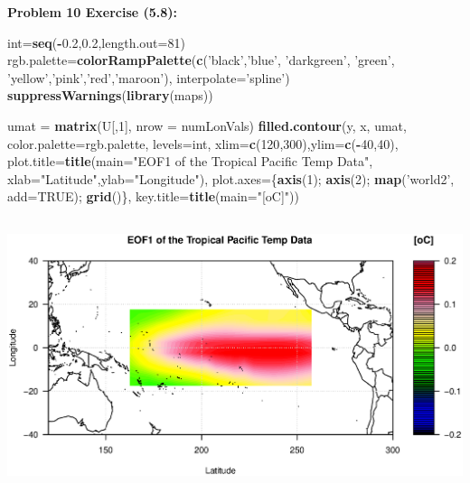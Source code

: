 \documentclass[11pt]{article}
\newenvironment{problem}[1]{\textbf{Problem #1: }}{\newpage}
\newenvironment{Shaded}{\begin{snugshade}}{\end{snugshade}}
\newcommand{\DataTypeTok}[1]{\textcolor[rgb]{0.13,0.29,0.53}{#1}}
\newcommand{\DecValTok}[1]{\textcolor[rgb]{0.00,0.00,0.81}{#1}}
\newcommand{\FloatTok}[1]{\textcolor[rgb]{0.00,0.00,0.81}{#1}}
\newcommand{\KeywordTok}[1]{\textcolor[rgb]{0.13,0.29,0.53}{\textbf{#1}}}
\newcommand{\NormalTok}[1]{#1}
\newcommand{\OperatorTok}[1]{\textcolor[rgb]{0.81,0.36,0.00}{\textbf{#1}}}
\newcommand{\OtherTok}[1]{\textcolor[rgb]{0.56,0.35,0.01}{#1}}
\newcommand{\StringTok}[1]{\textcolor[rgb]{0.31,0.60,0.02}{#1}}
\begin{document}
\begin{problem}{10 Exercise (5.8)}
\begin{enumerate}[label = (\alph*)]
\begin{Shaded}
\begin{Highlighting}[]
\NormalTok{int=}\KeywordTok{seq}\NormalTok{(}\OperatorTok{-}\FloatTok{0.2}\NormalTok{,}\FloatTok{0.2}\NormalTok{,}\DataTypeTok{length.out=}\DecValTok{81}\NormalTok{)}
\NormalTok{rgb.palette=}\KeywordTok{colorRampPalette}\NormalTok{(}\KeywordTok{c}\NormalTok{(}\StringTok{'black'}\NormalTok{,}\StringTok{'blue'}\NormalTok{, }\StringTok{'darkgreen'}\NormalTok{,}
                               \StringTok{'green'}\NormalTok{, }\StringTok{'yellow'}\NormalTok{,}\StringTok{'pink'}\NormalTok{,}\StringTok{'red'}\NormalTok{,}\StringTok{'maroon'}\NormalTok{),}
\DataTypeTok{interpolate=}\StringTok{'spline'}\NormalTok{)}
\KeywordTok{suppressWarnings}\NormalTok{(}\KeywordTok{library}\NormalTok{(maps))}
\end{Highlighting}
\end{Shaded}

\begin{Shaded}
\begin{Highlighting}
\NormalTok{umat =}\StringTok{ }\KeywordTok{matrix}\NormalTok{(U[,}\DecValTok{1}\NormalTok{], }\DataTypeTok{nrow =}\NormalTok{ numLonVals)}
\KeywordTok{filled.contour}\NormalTok{(y, x, umat, }\DataTypeTok{color.palette=}\NormalTok{rgb.palette, }\DataTypeTok{levels=}\NormalTok{int,}
               \DataTypeTok{xlim=}\KeywordTok{c}\NormalTok{(}\DecValTok{120}\NormalTok{,}\DecValTok{300}\NormalTok{),}\DataTypeTok{ylim=}\KeywordTok{c}\NormalTok{(}\OperatorTok{-}\DecValTok{40}\NormalTok{,}\DecValTok{40}\NormalTok{),}
               \DataTypeTok{plot.title=}\KeywordTok{title}\NormalTok{(}\DataTypeTok{main=}\StringTok{"EOF1 of the Tropical Pacific Temp Data"}\NormalTok{,}
                                \DataTypeTok{xlab=}\StringTok{"Latitude"}\NormalTok{,}\DataTypeTok{ylab=}\StringTok{"Longitude"}\NormalTok{),}
               \DataTypeTok{plot.axes=}\NormalTok{\{}\KeywordTok{axis}\NormalTok{(}\DecValTok{1}\NormalTok{); }\KeywordTok{axis}\NormalTok{(}\DecValTok{2}\NormalTok{); }\KeywordTok{map}\NormalTok{(}\StringTok{'world2'}\NormalTok{, }\DataTypeTok{add=}\OtherTok{TRUE}\NormalTok{); }\KeywordTok{grid}\NormalTok{()\},}
               \DataTypeTok{key.title=}\KeywordTok{title}\NormalTok{(}\DataTypeTok{main=}\StringTok{"[oC]"}\NormalTok{))}
\end{Highlighting}
\end{Shaded}

\includegraphics[height = 8cm]{Photos/EOF1}


\end{enumerate}
\end{problem}
\end{document}
